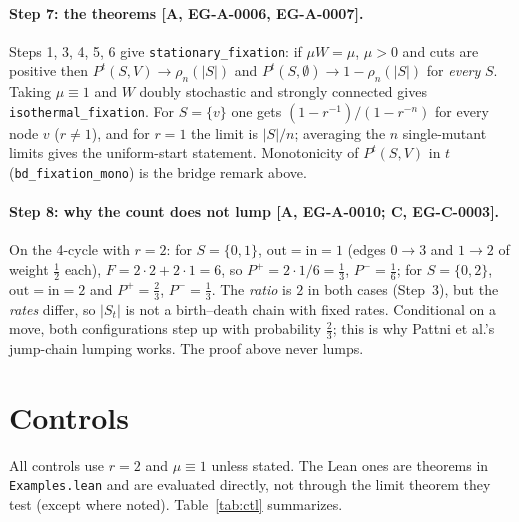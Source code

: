 \documentclass[11pt]{article}
\newcommand{\tier}[1]{\textsf{[#1]}}
\newcommand{\lean}[1]{\texttt{#1}}
\newcommand{\rhoF}{\rho_n}
\begin{document}
\paragraph{Step 7: the theorems \tier{A, EG-A-0006, EG-A-0007}.} Steps 1, 3, 4, 5, 6 give \lean{stationary\_fixation}: if $\mu W=\mu$, $\mu>0$ and cuts are positive then $P^t(S,V)\to\rhoF(|S|)$ and $P^t(S,\emptyset)\to1-\rhoF(|S|)$ for \emph{every} $S$. Taking $\mu\equiv1$ and $W$ doubly stochastic and strongly connected gives \lean{isothermal\_fixation}. For $S=\{v\}$ one gets $(1-r^{-1})/(1-r^{-n})$ for every node $v$ ($r\ne1$), and for $r=1$ the limit is $|S|/n$; averaging the $n$ single-mutant limits gives the uniform-start statement. Monotonicity of $P^t(S,V)$ in $t$ (\lean{bd\_fixation\_mono}) is the bridge remark above.



\paragraph{Step 8: why the count does not lump \tier{A, EG-A-0010; C, EG-C-0003}.} On the 4-cycle with $r=2$: for $S=\{0,1\}$, $\mathrm{out}=\mathrm{in}=1$ (edges $0\to3$ and $1\to2$ of weight $\tfrac12$ each), $F=2\cdot2+2\cdot1=6$, so $P^{+}=2\cdot1/6=\tfrac13$, $P^{-}=\tfrac16$; for $S=\{0,2\}$, $\mathrm{out}=\mathrm{in}=2$ and $P^{+}=\tfrac23$, $P^{-}=\tfrac13$. The \emph{ratio} is $2$ in both cases (Step~3), but the \emph{rates} differ, so $|S_t|$ is not a birth--death chain with fixed rates. Conditional on a move, both configurations step up with probability $\tfrac23$; this is why Pattni et al.'s jump-chain lumping works. The proof above never lumps.



\section{Controls}\label{sec:controls}
All controls use $r=2$ and $\mu\equiv1$ unless stated. The Lean ones are theorems in \texttt{Examples.lean} and are evaluated directly, not through the limit theorem they test (except where noted). Table~\ref{tab:ctl} summarizes.
\end{document}
